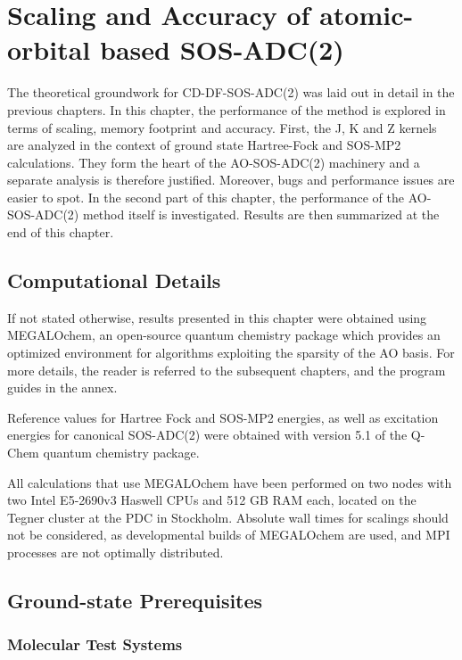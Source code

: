 \chapter{Scaling and Accuracy of atomic-orbital based SOS-ADC(2)}

The theoretical groundwork for CD-DF-SOS-ADC(2) was laid out in detail in the previous chapters. In this chapter, the performance of the method is explored in terms of scaling, memory footprint and accuracy. First, the J, K and Z kernels are analyzed in the context of ground state Hartree-Fock and SOS-MP2 calculations. They form the heart of the AO-SOS-ADC(2) machinery and a separate analysis is therefore justified. Moreover, bugs and performance issues are easier to spot. In the second part of this chapter, the performance of the AO-SOS-ADC(2) method itself is investigated. Results are then summarized at the end of this chapter. 

\section{Computational Details}

If not stated otherwise, results presented in this chapter were obtained using MEGALOchem, an open-source quantum chemistry package which provides an optimized environment for algorithms exploiting the sparsity of the AO basis. For more details, the reader is referred to the subsequent chapters, and the program guides in the annex.

Reference values for Hartree Fock and SOS-MP2 energies, as well as excitation energies for canonical SOS-ADC(2) were obtained with version 5.1 of the Q-Chem quantum chemistry package.

All calculations that use MEGALOchem have been performed on two nodes with two Intel E5-2690v3 Haswell CPUs and 512 GB RAM each, located on the Tegner cluster at the PDC in Stockholm. Absolute wall times for scalings should not be considered, as developmental builds of MEGALOchem are used, and MPI processes are not optimally distributed.  

\section{Ground-state Prerequisites}

\subsection{Molecular Test Systems}

